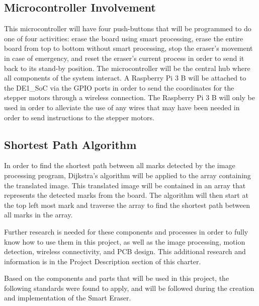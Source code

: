 \subsection{Microcontroller Involvement}
This microcontroller will have four push-buttons that will be programmed to do one of four activities: erase the board using smart processing, erase the entire board from top to bottom without smart processing, stop the eraser’s movement in case of emergency, and reset the eraser’s current process in order to send it back to its stand-by position. The microcontroller will be the central  hub where all components of the system interact. A Raspberry Pi 3 B will be attached to the DE1\_SoC via the GPIO ports in order to send the coordinates for the stepper motors through a wireless connection. The Raspberry Pi 3 B will only be used in order to alleviate the use of any wires that may have been needed in order to send instructions to the stepper motors.
\subsection{Shortest Path Algorithm}
In order to find the shortest path between all marks detected by the image processing program, Dijkstra's algorithm will be applied to the array containing the translated image. This translated image will be contained in an array that represents the detected marks from the board. The algorithm will then start at the top left most mark and traverse the array to find the shortest path between all marks in the array.\par

Further research is needed for these components and processes in order to fully know how to use them in this project, as well as the image processing, motion detection, wireless connectivity, and PCB design. This additional research and information is in the Project Description section of this charter. \par

Based on the components and parts that will be used in this project, the following standards were found to apply, and will be followed during the creation and implementation of the Smart Eraser.

